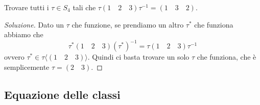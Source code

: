 \documentclass[11pt]{scrartcl}
\begin{document}
	\begin{exercise}
		Trovare tutti i $\tau\in S_4$ tali che $\tau(1\quad 2 \quad 3)\tau^{-1}=\left(1 \quad 3 \quad 2\right)$.
	\end{exercise}
	\begin{proof}[Soluzione]
		Dato un $\tau$ che funzione, se prendiamo un altro $\tau^*$ che funziona abbiamo che
		$$\tau^*\left(1\quad 2 \quad 3\right)\left(\tau^*\right)^{-1}=\tau\left(1\quad 2 \quad 3\right)\tau^{-1}$$
		ovvero $\tau^*\in \tau\langle\left(1\quad 2 \quad 3\right)\rangle$. Quindi ci basta trovare un solo $\tau$ che funziona, che è semplicemente $\tau=\left(2 \quad 3\right)$. 
	\end{proof}
	
	 \subsection{Equazione delle classi}
	 
\end{document}

